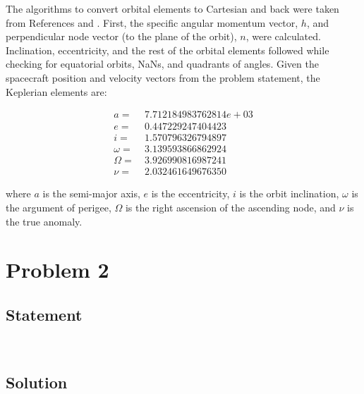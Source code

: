 \documentclass[conf]{new-aiaa}
\begin{document}
The algorithms to convert orbital elements to Cartesian and back were taken from References \cite{bate_astrodynamics} and \cite{jah_mod3}. First, the specific angular momentum vector, $h$, and perpendicular node vector (to the plane of the orbit), $n$, were calculated. Inclination, eccentricity, and the rest of the orbital elements followed while checking for equatorial orbits, NaNs, and quadrants of angles. Given the spacecraft position and velocity vectors from the problem statement, the Keplerian elements are: 

\begin{equation}
\begin{aligned}
a = &~ 7.712184983762814e+03 \\ 
e = &~ 0.447229247404423 \\ 
i = &~ 1.570796326794897 \\ 
\omega = &~ 3.139593866862924 \\ 
\Omega = &~ 3.926990816987241 \\ 
\nu = &~ 2.032461649676350  
\end{aligned}
\end{equation}

where $a$ is the semi-major axis, $e$ is the eccentricity, $i$ is the orbit inclination, $\omega$ is the argument of perigee, $\Omega$ is the right ascension of the ascending node, and $\nu$ is the true anomaly. 

\section{Problem 2} 

\subsection{Statement} 
\begin{center}
 \\
\end{center}

\subsection{Solution} 
\end{document}
